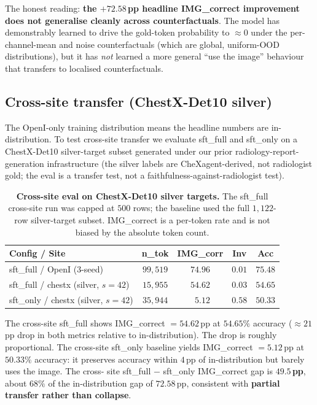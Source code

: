 \documentclass{article}
\begin{document}
The honest reading: \textbf{the $+72.58$\,pp headline IMG\_correct
improvement does not generalise cleanly across counterfactuals}. The model
has demonstrably learned to drive the gold-token probability to $\approx 0$
under the per-channel-mean and noise counterfactuals (which are global,
uniform-OOD distributions), but it has \emph{not} learned a more general
``use the image'' behaviour that transfers to localised counterfactuals.

\subsection{Cross-site transfer (ChestX-Det10 silver)}
\label{sec:crosssite}

The OpenI-only training distribution means the headline numbers are
in-distribution. To test cross-site transfer we evaluate sft\_full and
sft\_only on a ChestX-Det10 \citep{liu2020chestxdet} silver-target subset
generated under our prior radiology-report-generation infrastructure (the
silver labels are CheXagent-derived, not radiologist gold; the eval is a
transfer test, not a faithfulness-against-radiologist test).

\begin{table}[t]
\centering
\footnotesize
\caption{\textbf{Cross-site eval on ChestX-Det10 silver targets.} The
sft\_full cross-site run was capped at $500$ rows; the baseline used the
full $1{,}122$-row silver-target subset. IMG\_correct is a per-token rate
and is not biased by the absolute token count.}
\label{tab:crosssite}
\setlength{\tabcolsep}{2.0pt}
\begin{tabular}{lcccc}
\toprule
\textbf{Config / Site} & \textbf{n\_tok} & \textbf{IMG\_corr} & \textbf{Inv} & \textbf{Acc}\\
\midrule
sft\_full / OpenI (3-seed) & $99{,}519$ & $74.96$ & $0.01$ & $75.48$\\
sft\_full / chestx (silver, $s{=}42$) & $15{,}955$ & $54.62$ & $0.03$ & $54.65$\\
sft\_only / chestx (silver, $s{=}42$) & $35{,}944$ & $\phantom{0}5.12$ & $0.58$ & $50.33$\\
\bottomrule
\end{tabular}
\end{table}

The cross-site sft\_full shows IMG\_correct $= 54.62$\,pp at $54.65\%$
accuracy ($\approx 21$\,pp drop in both metrics relative to in-distribution).
The drop is roughly proportional. The cross-site sft\_only baseline yields
IMG\_correct $= 5.12$\,pp at $50.33\%$ accuracy: it preserves accuracy
within $4$\,pp of in-distribution but barely uses the image. The cross-
site sft\_full $-$ sft\_only IMG\_correct gap is $\mathbf{49.5}$\,\textbf{pp},
about $68\%$ of the in-distribution gap of $72.58$\,pp, consistent with
\textbf{partial transfer rather than collapse}.
\end{document}
